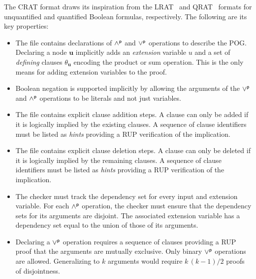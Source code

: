 \documentclass[letterpaper,USenglish,cleveref, autoref, thm-restate]{lipics-v2021}
\newcommand{\pand}{\mathbin{\land^{\sf p}}}
\newcommand{\por}{\mathbin{\lor^{\sf p}}}
\newcommand{\makenode}[1]{\mathbf{#1}}
\newcommand{\nodeu}{\makenode{u}}
\begin{document}

The CRAT format draws its inspiration from the LRAT~\cite{lrat} and
QRAT~\cite{heule:JAR2014} formats for unquantified and quantified Boolean formulas, respectively.
The following are its key properties:
\begin{itemize}
  \item
  The file contains declarations of $\pand$ and $\por$ operations to describe the POG.
  Declaring a node $\nodeu$
implicitly adds an {\em extension} variable $u$ and a set of {\em defining} clauses $\theta_{\nodeu}$
  encoding the product or sum operation.
  This is the only means for adding extension variables to the proof.
\item Boolean negation is supported implicitly by allowing the
  arguments of the $\por$ and $\pand$ operations to be literals and not just
  variables.
\item
  The file contains explicit clause addition steps.
  A clause can only be added if it is logically implied by the existing clauses.
  A sequence of clause identifiers must be listed as {\em hints} providing a RUP verification of the implication.
\item
  The file contains explicit clause deletion steps.
  A clause can only be deleted if it is logically implied by the remaining clauses.
  A sequence of clause identifiers must be listed as {\em hints} providing a RUP verification of the implication.
\item The checker must track the dependency set for every input and
  extension variable.  For each $\pand$ operation, the checker must ensure that the dependency sets for its arguments are disjoint.
  The associated extension variable has a dependency set equal to the union of those of its arguments.
\item Declaring a $\por$ operation requires a sequence of clauses
  providing a RUP proof that the arguments are mutually exclusive.
  Only binary $\por$ operations are allowed.  Generalizing to $k$ arguments would require
  $k\,(k-1)/2$ proofs of disjointness.
\end{itemize}
\end{document}
